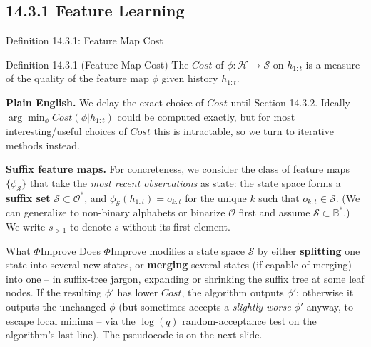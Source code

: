 \documentclass[aspectratio=169,10pt]{beamer}
\newcommand{\B}{\mathbb{B}}
\newcommand{\Hc}{\mathcal{H}}
\newcommand{\Sc}{\mathcal{S}}
\newcommand{\Oc}{\mathcal{O}}
\begin{document}
\subsection{14.3.1 Feature Learning}

\begin{frame}{Definition 14.3.1: Feature Map Cost}
  \begin{block}{Definition 14.3.1 (Feature Map Cost)}
    The $\mathit{Cost}$ of $\phi:\Hc\to\Sc$ on $h_{1:t}$ is a measure of
    the quality of the feature map $\phi$ given history $h_{1:t}$.
  \end{block}
  \textbf{Plain English.} We delay the exact choice of $\mathit{Cost}$
  until Section 14.3.2. Ideally $\arg\min_\phi \mathit{Cost}(\phi|h_{1:t})$
  could be computed exactly, but for most interesting/useful choices of
  $\mathit{Cost}$ this is intractable, so we turn to iterative methods
  instead.

  \vspace{0.4em}
  \textbf{Suffix feature maps.} For concreteness, we consider the class of
  feature maps $\{\phi_\Sc\}$ that take the \emph{most recent observations}
  as state: the state space forms a \textbf{suffix set}
  $\Sc\subset\Oc^*$, and $\phi_\Sc(h_{1:t})=o_{k:t}$ for the unique $k$
  such that $o_{k:t}\in\Sc$. (We can generalize to non-binary alphabets or
  binarize $\Oc$ first and assume $\Sc\subset\B^*$.) We write $s_{>1}$ to
  denote $s$ without its first element.
\end{frame}

\begin{frame}{What $\Phi$Improve Does}
  $\Phi$Improve modifies a state space $\Sc$ by either \textbf{splitting}
  one state into several new states, or \textbf{merging} several states
  (if capable of merging) into one -- in suffix-tree jargon, expanding or
  shrinking the suffix tree at some leaf nodes. If the resulting $\phi'$
  has lower $Cost$, the algorithm outputs $\phi'$; otherwise it outputs the
  unchanged $\phi$ (but sometimes accepts a \emph{slightly worse} $\phi'$
  anyway, to escape local minima -- via the $\log(q)$ random-acceptance
  test on the algorithm's last line). The pseudocode is on the next slide.
\end{frame}
\end{document}
